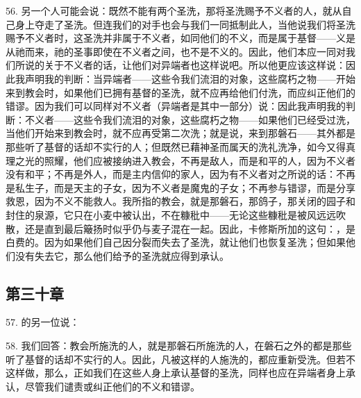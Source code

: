 56. 另一个人可能会说：既然不能有两个圣洗，那将圣洗赐予不义者的人，就从自己身上夺走了圣洗。但连我们的对手也会与我们一同抵制此人，当他说我们将圣洗赐予不义者时，这圣洗并非属于不义者，如同他们的不义，而是属于基督——义是从祂而来，祂的圣事即使在不义者之间，也不是不义的。因此，他们本应一同对我们所说的关于不义者的话，让他们对异端者也这样说吧。所以他更应该这样说：因此我声明我的判断：当异端者——这些令我们流泪的对象，这些腐朽之物——开始来到教会时，如果他们已拥有基督的圣洗，就不应再给他们付洗，而应纠正他们的错谬。因为我们可以同样对不义者（异端者是其中一部分）说：因此我声明我的判断：不义者——这些令我们流泪的对象，这些腐朽之物——如果他们已经受过洗，当他们开始来到教会时，就不应再受第二次洗；就是说，来到那磐石——其外都是那些听了基督的话却不实行的人；但既然已藉神圣而属天的洗礼洗净，如今又得真理之光的照耀，他们应被接纳进入教会，不再是敌人，而是和平的人，因为不义者没有和平；不再是外人，而是主内信仰的家人，因为有不义者对之所说的话：不再是私生子，而是天主的子女，因为不义者是魔鬼的子女；不再参与错谬，而是分享救恩，因为不义不能救人。我所指的教会，就是那磐石，那鸽子，那关闭的园子和封住的泉源，它只在小麦中被认出，不在糠秕中——无论这些糠秕是被风远远吹散，还是直到最后簸扬时似乎仍与麦子混在一起。因此，卡修斯所加的这句：，是白费的。因为如果他们自己因分裂而失去了圣洗，就让他们也恢复圣洗；但如果他们没有失去它，那么他们给予的圣洗就应得到承认。\par


\subsection{第三十章}

57. 的另一位说：\par

58. 我们回答：教会所施洗的人，就是那磐石所施洗的人，在磐石之外的都是那些听了基督的话却不实行的人。因此，凡被这样的人施洗的，都应重新受洗。但若不这样做，那么，正如我们在这些人身上承认基督的圣洗，同样也应在异端者身上承认，尽管我们谴责或纠正他们的不义和错谬。\par


